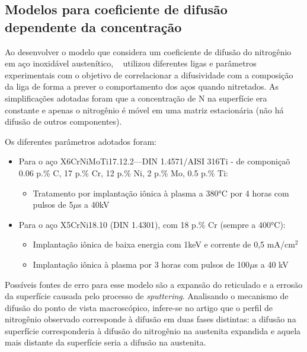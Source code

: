 \documentclass[]{politex}
\begin{document}
\subsection{Modelos para coeficiente de difusão dependente da concentração}
\label{sec:concdep}
	Ao desenvolver o modelo que considera um coeficiente de difusão do nitrogênio em aço inoxidável austenítico, ~\cite{mandl2003nitrogen} utilizou diferentes ligas e parâmetros experimentais com o objetivo de correlacionar a difusividade com a composição da liga de forma a prever o comportamento dos aços quando nitretados. As simplificações adotadas foram que a concentração de N na superfície era constante e apenas o nitrogênio é móvel em uma matriz estacionária (não há difusão de outros componentes).\par
	Os diferentes parâmetros adotados foram:
	\begin{itemize}
	 \item Para o aço X6CrNiMoTi17.12.2—DIN 1.4571/AISI 316Ti - de componiçaõ 0.06 p.\% C, 17 p.\% Cr, 12 p.\% Ni, 2 p.\% Mo, 0.5 p.\% Ti:
		\begin{itemize}
		 \item Tratamento por implantação iônica à plasma a 380°C por 4 horas com pulsos de 5$\mu$s a 40kV
		\end{itemize}
	 \item Para o aço X5CrNi18.10 (DIN 1.4301), com 18 p.\% Cr (sempre a 400°C):
		\begin{itemize}
		 \item Implantação iônica de baixa energia com 1keV e corrente de 0,5 mA/cm$^2$
		 \item Implantação iônica à plasma por 3 horas com pulsos de 100$\mu$s a 40 kV
		\end{itemize} 
	\end{itemize}
	Possíveis fontes de erro para esse modelo são a expansão do reticulado e a errosão da superfície causada pelo processo de \textit{sputtering}.
	Analisando o mecanismo de difusão do ponto de vista macroscópico, infere-se no artigo que o perfil de nitrogênio observado corresponde à difusão em duas fases distintas: a difusão na superfície corresponderia à difusão do nitrogênio na austenita expandida e aquela mais distante da superfície seria a difusão na austenita.\par
\end{document}
